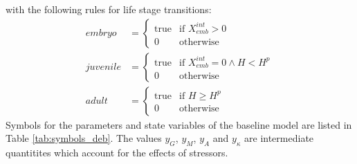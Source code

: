 \documentclass[utf8]{FrontiersinHarvard} %
\begin{document}
%
with the following rules for life stage transitions: 
%
\begin{align}
    embryo &= 
    \begin{cases}
        \text{true} & \text{if } X_{emb}^{int} > 0 \\
        0 & \text{otherwise}
    \end{cases} \\
    juvenile &= 
    \begin{cases}
        \text{true} & \text{if } X_{emb}^{int} = 0 \land H < H^p \\ 
        0 & \text{otherwise}
    \end{cases} \\
    adult &= 
    \begin{cases}
        \text{true} & \text{if } H \geq H^p \\ 
        0 & \text{otherwise}
    \end{cases}
    \label{eq:lifestages}
\end{align}%
%
Symbols for the parameters and state variables of the baseline model are listed in Table \ref{tab:symbols_deb}.
The values $y_G$, $y_M$, $y_A$ and $y_{\kappa}$ 
are intermediate quantitites which account for the effects of stressors.
\end{document}
